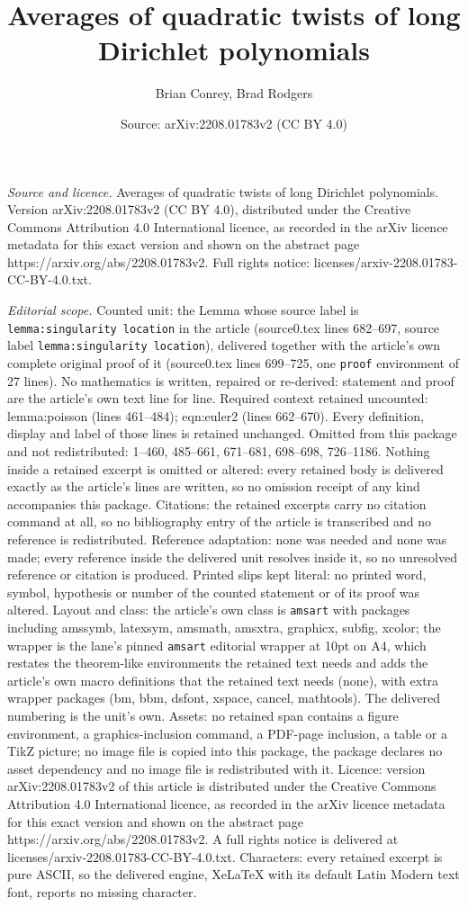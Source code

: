 \documentclass[10pt,a4paper]{amsart}
\title[Averages of quadratic twists of long Dirichlet polynomials]{Averages of quadratic twists of long Dirichlet polynomials}
\author{Brian Conrey, Brad Rodgers}
\date{Source: arXiv:2208.01783v2 (CC BY 4.0)}
\begin{document}
\maketitle

\noindent\emph{Source and licence.} Averages of quadratic twists of long Dirichlet polynomials. Version arXiv:2208.01783v2 (CC BY 4.0), distributed under the Creative Commons Attribution 4.0 International licence, as recorded in the arXiv licence metadata for this exact version and shown on the abstract page https://arxiv.org/abs/2208.01783v2. Full rights notice: licenses/arxiv-2208.01783-CC-BY-4.0.txt.\par\smallskip

\noindent\textit{Editorial scope.} Counted unit: the Lemma whose source label is \texttt{lemma:singularity location} in the article (source0.tex lines 682--697, source label \texttt{lemma:singularity location}), delivered together with the article's own complete original proof of it (source0.tex lines 699--725, one \texttt{proof} environment of 27 lines). No mathematics is written, repaired or re-derived: statement and proof are the article's own text line for line. Required context retained uncounted: lemma:poisson (lines 461--484); eqn:euler2 (lines 662--670). Every definition, display and label of those lines is retained unchanged. Omitted from this package and not redistributed: 1--460, 485--661, 671--681, 698--698, 726--1186. Nothing inside a retained excerpt is omitted or altered: every retained body is delivered exactly as the article's lines are written, so no omission receipt of any kind accompanies this package. Citations: the retained excerpts carry no citation command at all, so no bibliography entry of the article is transcribed and no reference is redistributed. Reference adaptation: none was needed and none was made; every reference inside the delivered unit resolves inside it, so no unresolved reference or citation is produced. Printed slips kept literal: no printed word, symbol, hypothesis or number of the counted statement or of its proof was altered. Layout and class: the article's own class is \texttt{amsart} with packages including amssymb, latexsym, amsmath, amsxtra, graphicx, subfig, xcolor; the wrapper is the lane's pinned \texttt{amsart} editorial wrapper at 10pt on A4, which restates the theorem-like environments the retained text needs and adds the article's own macro definitions that the retained text needs (none), with extra wrapper packages (bm, bbm, dsfont, xspace, cancel, mathtools). The delivered numbering is the unit's own. Assets: no retained span contains a figure environment, a graphics-inclusion command, a PDF-page inclusion, a table or a TikZ picture; no image file is copied into this package, the package declares no asset dependency and no image file is redistributed with it. Licence: version arXiv:2208.01783v2 of this article is distributed under the Creative Commons Attribution 4.0 International licence, as recorded in the arXiv licence metadata for this exact version and shown on the abstract page https://arxiv.org/abs/2208.01783v2. A full rights notice is delivered at licenses/arxiv-2208.01783-CC-BY-4.0.txt. Characters: every retained excerpt is pure ASCII, so the delivered engine, XeLaTeX with its default Latin Modern text font, reports no missing character.
\end{document}
